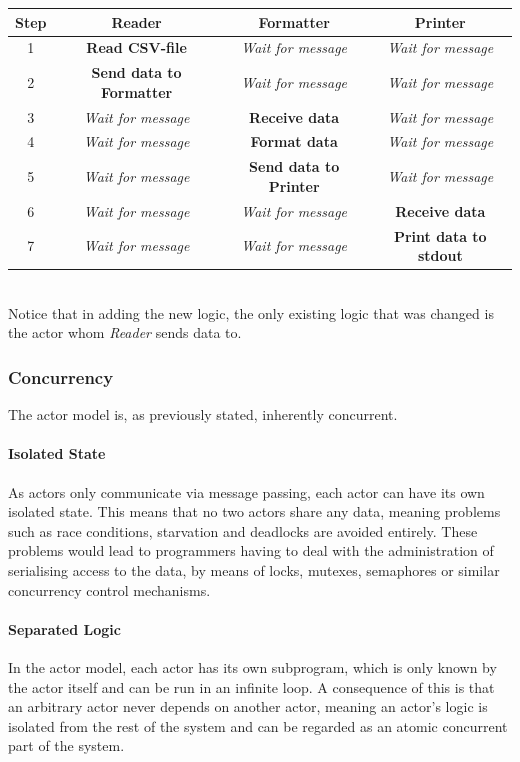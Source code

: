 \begin{tabular}{ | c | c | c | c | }
\hline
Step & Reader & Formatter & Printer \\\hline
1 & \textbf{Read CSV-file} & \textit{Wait for message} & \textit{Wait for message} \\\hline
2 & \textbf{Send data to Formatter} & \textit{Wait for message} & \textit{Wait for message}\\\hline
3 & \textit{Wait for message} & \textbf{Receive data} & \textit{Wait for message} \\\hline
4 & \textit{Wait for message} & \textbf{Format data} & \textit{Wait for message} \\\hline
5 & \textit{Wait for message} & \textbf{Send data to Printer} & \textit{Wait for message} \\\hline
6 & \textit{Wait for message} & \textit{Wait for message} & \textbf{Receive data}\\\hline
7 & \textit{Wait for message} & \textit{Wait for message} & \textbf{Print data to stdout} \\\hline
\end{tabular}\\

Notice that in adding the new logic, the only existing logic that was changed is the actor whom \emph{Reader} sends data to.

\subsubsection{Concurrency}
The actor model is, as previously stated, inherently concurrent.

\paragraph{Isolated State}
As actors only communicate via message passing, each actor can have its own isolated state. This means that no two actors share any data, meaning problems such as race conditions, starvation and deadlocks are avoided entirely. These problems would lead to programmers having to deal with the administration of serialising access to the data, by means of locks, mutexes, semaphores or similar concurrency control mechanisms.

\paragraph{Separated Logic}
In the actor model, each actor has its own subprogram, which is only known by the actor itself and can be run in an infinite loop. A consequence of this is that an arbitrary actor never depends on another actor, meaning an actor's logic is isolated from the rest of the system and can be regarded as an atomic concurrent part of the system.

